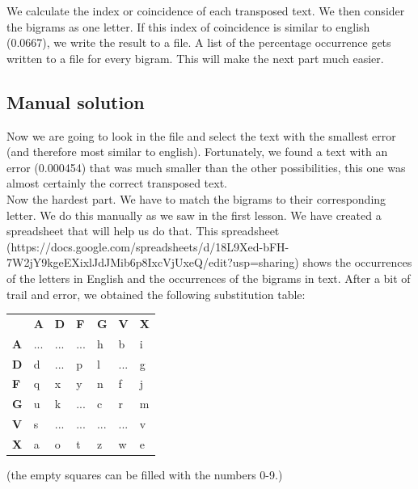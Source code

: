\documentclass{article}
\begin{document}
We calculate the index or coincidence of each transposed text. We then consider the bigrams as one letter. If this index of coincidence is similar to english (0.0667), we write the result to a file. A list of the percentage occurrence gets written to a file for every bigram. This will make the next part much easier.
\subsection{Manual solution}
Now we are going to look in the file and select the text with the smallest error (and therefore most similar to english). Fortunately, we found a text with an error (0.000454) that was much smaller than the other possibilities, this one was almost certainly the correct transposed text.\\

Now the hardest part. We have to match the bigrams to their corresponding letter. We do this manually as we saw in the first lesson. We have created a spreadsheet that will help us do that. This spreadsheet (https://docs.google.com/spreadsheets/d/18L9Xed-bFH-7W2jY9kgeEXixlJdJMib6p8IxcVjUxeQ/edit?usp=sharing) shows the occurrences of the letters in English and the occurrences of the bigrams in text. After a bit of trail and error, we obtained the following substitution table:
\begin{table}[H]
\begin{tabular}{lllllll}
\textbf{} &
  \textbf{A} &
  \textbf{D} &
  \textbf{F} &
  \textbf{G} &
  \textbf{V} &
  \textbf{X} \\ \cline{2-7}
\multicolumn{1}{l|}{\textbf{A}} &
  \multicolumn{1}{l|}{...} &
  \multicolumn{1}{l|}{...} &
  \multicolumn{1}{l|}{...} &
  \multicolumn{1}{l|}{h} &
  \multicolumn{1}{l|}{b} &
  \multicolumn{1}{l|}{i} \\ \cline{2-7}
\multicolumn{1}{l|}{\textbf{D}} &
  \multicolumn{1}{l|}{d} &
  \multicolumn{1}{l|}{...} &
  \multicolumn{1}{l|}{p} &
  \multicolumn{1}{l|}{l} &
  \multicolumn{1}{l|}{...} &
  \multicolumn{1}{l|}{g} \\ \cline{2-7}
\multicolumn{1}{l|}{\textbf{F}} &
  \multicolumn{1}{l|}{q} &
  \multicolumn{1}{l|}{x} &
  \multicolumn{1}{l|}{y} &
  \multicolumn{1}{l|}{n} &
  \multicolumn{1}{l|}{f} &
  \multicolumn{1}{l|}{j} \\ \cline{2-7}
\multicolumn{1}{l|}{\textbf{G}} &
  \multicolumn{1}{l|}{u} &
  \multicolumn{1}{l|}{k} &
  \multicolumn{1}{l|}{...} &
  \multicolumn{1}{l|}{c} &
  \multicolumn{1}{l|}{r} &
  \multicolumn{1}{l|}{m} \\ \cline{2-7}
\multicolumn{1}{l|}{\textbf{V}} &
  \multicolumn{1}{l|}{s} &
  \multicolumn{1}{l|}{...} &
  \multicolumn{1}{l|}{...} &
  \multicolumn{1}{l|}{...} &
  \multicolumn{1}{l|}{...} &
  \multicolumn{1}{l|}{v} \\ \cline{2-7}
\multicolumn{1}{l|}{\textbf{X}} &
  \multicolumn{1}{l|}{a} &
  \multicolumn{1}{l|}{o} &
  \multicolumn{1}{l|}{t} &
  \multicolumn{1}{l|}{z} &
  \multicolumn{1}{l|}{w} &
  \multicolumn{1}{l|}{e} \\ \cline{2-7}
\end{tabular}
\end{table}
(the empty squares can be filled with the numbers 0-9.)
\end{document}
